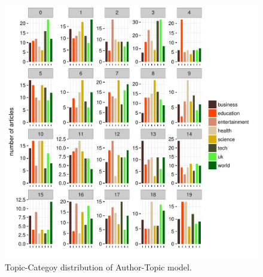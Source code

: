 \begin{figure}[h]
\centering
\includegraphics[width=1\textwidth]{figures/at_topic_category.pdf}
\caption{Topic-Categoy distribution of Author-Topic model.}
\label{fig:at_topic_category}
\end{figure}


